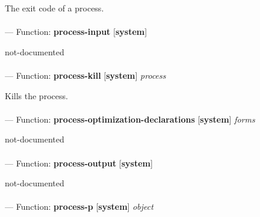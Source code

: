 \begin{adjustwidth}{5em}{5em}
The exit code of a process.
\end{adjustwidth}

\paragraph{}
\label{SYSTEM:PROCESS-INPUT}
--- Function: \textbf{process-input} [\textbf{system}] \textit{}

\begin{adjustwidth}{5em}{5em}
not-documented
\end{adjustwidth}

\paragraph{}
\label{SYSTEM:PROCESS-KILL}
--- Function: \textbf{process-kill} [\textbf{system}] \textit{process}

\begin{adjustwidth}{5em}{5em}
Kills the process.
\end{adjustwidth}

\paragraph{}
\label{SYSTEM:PROCESS-OPTIMIZATION-DECLARATIONS}
--- Function: \textbf{process-optimization-declarations} [\textbf{system}] \textit{forms}

\begin{adjustwidth}{5em}{5em}
not-documented
\end{adjustwidth}

\paragraph{}
\label{SYSTEM:PROCESS-OUTPUT}
--- Function: \textbf{process-output} [\textbf{system}] \textit{}

\begin{adjustwidth}{5em}{5em}
not-documented
\end{adjustwidth}

\paragraph{}
\label{SYSTEM:PROCESS-P}
--- Function: \textbf{process-p} [\textbf{system}] \textit{object}

